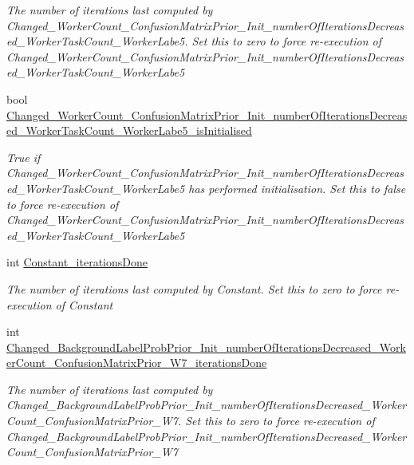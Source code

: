 \begin{DoxyCompactItemize}
\begin{DoxyCompactList}\small\item\em The number of iterations last computed by Changed\+\_\+\+Worker\+Count\+\_\+\+Confusion\+Matrix\+Prior\+\_\+\+Init\+\_\+number\+Of\+Iterations\+Decreased\+\_\+\+Worker\+Task\+Count\+\_\+\+Worker\+Labe5. Set this to zero to force re-\/execution of Changed\+\_\+\+Worker\+Count\+\_\+\+Confusion\+Matrix\+Prior\+\_\+\+Init\+\_\+number\+Of\+Iterations\+Decreased\+\_\+\+Worker\+Task\+Count\+\_\+\+Worker\+Labe5\end{DoxyCompactList}\item 
bool \hyperlink{class_microsoft_research_1_1_infer_1_1_models_1_1_user_1_1_model___e_p_abad013c605a772f90c9b7c700fcfe077}{Changed\+\_\+\+Worker\+Count\+\_\+\+Confusion\+Matrix\+Prior\+\_\+\+Init\+\_\+number\+Of\+Iterations\+Decreased\+\_\+\+Worker\+Task\+Count\+\_\+\+Worker\+Labe5\+\_\+is\+Initialised}
\begin{DoxyCompactList}\small\item\em True if Changed\+\_\+\+Worker\+Count\+\_\+\+Confusion\+Matrix\+Prior\+\_\+\+Init\+\_\+number\+Of\+Iterations\+Decreased\+\_\+\+Worker\+Task\+Count\+\_\+\+Worker\+Labe5 has performed initialisation. Set this to false to force re-\/execution of Changed\+\_\+\+Worker\+Count\+\_\+\+Confusion\+Matrix\+Prior\+\_\+\+Init\+\_\+number\+Of\+Iterations\+Decreased\+\_\+\+Worker\+Task\+Count\+\_\+\+Worker\+Labe5\end{DoxyCompactList}\item 
int \hyperlink{class_microsoft_research_1_1_infer_1_1_models_1_1_user_1_1_model___e_p_a96cd83a67ce48692b2dd5f13b31f06b9}{Constant\+\_\+iterations\+Done}
\begin{DoxyCompactList}\small\item\em The number of iterations last computed by Constant. Set this to zero to force re-\/execution of Constant\end{DoxyCompactList}\item 
int \hyperlink{class_microsoft_research_1_1_infer_1_1_models_1_1_user_1_1_model___e_p_ae58eb5265f8700b885d370e8fe410802}{Changed\+\_\+\+Background\+Label\+Prob\+Prior\+\_\+\+Init\+\_\+number\+Of\+Iterations\+Decreased\+\_\+\+Worker\+Count\+\_\+\+Confusion\+Matrix\+Prior\+\_\+\+W7\+\_\+iterations\+Done}
\begin{DoxyCompactList}\small\item\em The number of iterations last computed by Changed\+\_\+\+Background\+Label\+Prob\+Prior\+\_\+\+Init\+\_\+number\+Of\+Iterations\+Decreased\+\_\+\+Worker\+Count\+\_\+\+Confusion\+Matrix\+Prior\+\_\+\+W7. Set this to zero to force re-\/execution of Changed\+\_\+\+Background\+Label\+Prob\+Prior\+\_\+\+Init\+\_\+number\+Of\+Iterations\+Decreased\+\_\+\+Worker\+Count\+\_\+\+Confusion\+Matrix\+Prior\+\_\+\+W7\end{DoxyCompactList}\item 

\end{DoxyCompactItemize}
